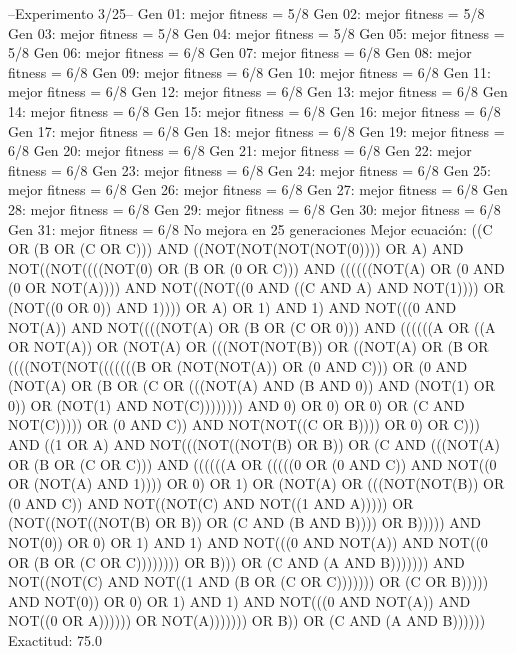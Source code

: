 --Experimento 
 3/25--
Gen 01: mejor fitness = 5/8
Gen 02: mejor fitness = 5/8
Gen 03: mejor fitness = 5/8
Gen 04: mejor fitness = 5/8
Gen 05: mejor fitness = 5/8
Gen 06: mejor fitness = 6/8
Gen 07: mejor fitness = 6/8
Gen 08: mejor fitness = 6/8
Gen 09: mejor fitness = 6/8
Gen 10: mejor fitness = 6/8
Gen 11: mejor fitness = 6/8
Gen 12: mejor fitness = 6/8
Gen 13: mejor fitness = 6/8
Gen 14: mejor fitness = 6/8
Gen 15: mejor fitness = 6/8
Gen 16: mejor fitness = 6/8
Gen 17: mejor fitness = 6/8
Gen 18: mejor fitness = 6/8
Gen 19: mejor fitness = 6/8
Gen 20: mejor fitness = 6/8
Gen 21: mejor fitness = 6/8
Gen 22: mejor fitness = 6/8
Gen 23: mejor fitness = 6/8
Gen 24: mejor fitness = 6/8
Gen 25: mejor fitness = 6/8
Gen 26: mejor fitness = 6/8
Gen 27: mejor fitness = 6/8
Gen 28: mejor fitness = 6/8
Gen 29: mejor fitness = 6/8
Gen 30: mejor fitness = 6/8
Gen 31: mejor fitness = 6/8
No mejora en 25 generaciones
Mejor ecuación: ((C OR (B OR (C OR C))) AND ((NOT(NOT(NOT(NOT(0)))) OR A) AND NOT((NOT((((NOT(0) OR (B OR (0 OR C))) AND ((((((NOT(A) OR (0 AND (0 OR NOT(A)))) AND NOT((NOT((0 AND ((C AND A) AND NOT(1)))) OR (NOT((0 OR 0)) AND 1)))) OR A) OR 1) AND 1) AND NOT(((0 AND NOT(A)) AND NOT((((NOT(A) OR (B OR (C OR 0))) AND ((((((A OR ((A OR NOT(A)) OR (NOT(A) OR (((NOT(NOT(B)) OR ((NOT(A) OR (B OR ((((NOT(NOT(((((((B OR (NOT(NOT(A)) OR (0 AND C))) OR (0 AND (NOT(A) OR (B OR (C OR (((NOT(A) AND (B AND 0)) AND (NOT(1) OR 0)) OR (NOT(1) AND NOT(C)))))))) AND 0) OR 0) OR 0) OR (C AND NOT(C))))) OR (0 AND C)) AND NOT(NOT((C OR B)))) OR 0) OR C))) AND ((1 OR A) AND NOT(((NOT((NOT(B) OR B)) OR (C AND (((NOT(A) OR (B OR (C OR C))) AND ((((((A OR (((((0 OR (0 AND C)) AND NOT((0 OR (NOT(A) AND 1)))) OR 0) OR 1) OR (NOT(A) OR (((NOT(NOT(B)) OR (0 AND C)) AND NOT((NOT(C) AND NOT((1 AND A))))) OR (NOT((NOT((NOT(B) OR B)) OR (C AND (B AND B)))) OR B))))) AND NOT(0)) OR 0) OR 1) AND 1) AND NOT(((0 AND NOT(A)) AND NOT((0 OR (B OR (C OR C)))))))) OR B))) OR (C AND (A AND B))))))) AND NOT((NOT(C) AND NOT((1 AND (B OR (C OR C))))))) OR (C OR B))))) AND NOT(0)) OR 0) OR 1) AND 1) AND NOT(((0 AND NOT(A)) AND NOT((0 OR A)))))) OR NOT(A))))))) OR B)) OR (C AND (A AND B))))))
 Exactitud: 75.0%

